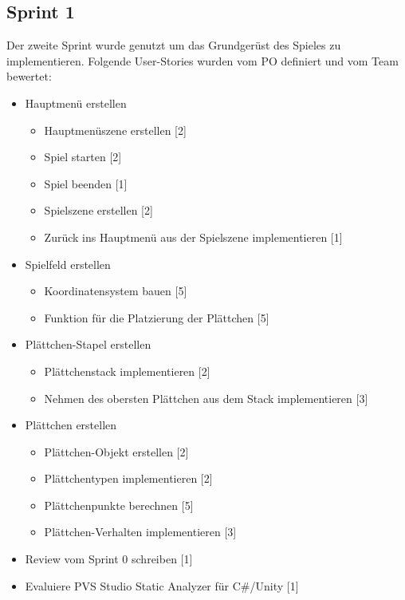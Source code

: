 \documentclass[../main.tex]{subfiles}
\begin{document}
	\newpage
	\subsection{Sprint 1}
	
	\par Der zweite Sprint wurde genutzt um das Grundgerüst des Spieles zu implementieren. Folgende User-Stories wurden vom PO definiert und vom Team bewertet:
	
	\begin{itemize}
		\item Hauptmenü erstellen
		\begin{itemize}
			\item Hauptmenüszene erstellen [2]
			\item Spiel starten [2]
			\item Spiel beenden [1]
			\item Spielszene erstellen [2]
			\item Zurück ins Hauptmenü aus der Spielszene implementieren [1]
		\end{itemize}
		\item Spielfeld erstellen
		\begin{itemize}
			\item Koordinatensystem bauen [5]
			\item Funktion für die Platzierung der Plättchen [5]
		\end{itemize}
		\item Plättchen-Stapel erstellen
		\begin{itemize}
			\item Plättchenstack implementieren [2]
			\item Nehmen des obersten Plättchen aus dem Stack implementieren [3]
		\end{itemize}
		\item Plättchen erstellen
		\begin{itemize}
			\item Plättchen-Objekt erstellen [2]
			\item Plättchentypen implementieren [2]
			\item Plättchenpunkte berechnen [5]
			\item Plättchen-Verhalten implementieren [3]
		\end{itemize}
		\item Review vom Sprint 0 schreiben [1]
		\item Evaluiere PVS Studio Static Analyzer für C\#/Unity [1]
	\end{itemize} 
\end{document}
